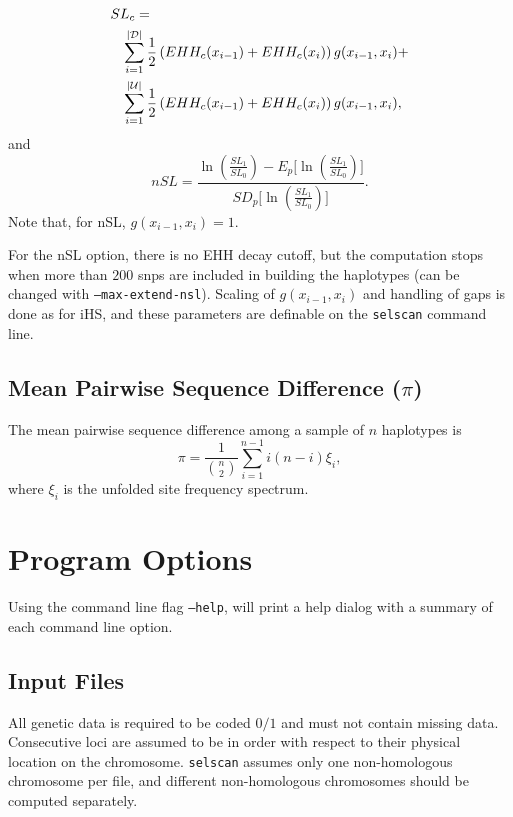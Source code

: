 \documentclass[12pt]{article}%
\newcommand{\negspace}{\!\!\!\!\!\!\!\!\!\!\!\!}
\begin{document}
\begin{align}\label{eq:sl}
SL_c =& \notag\\
&\negspace\sum_{i = 1}^{|\mathcal{D}|} \frac{1}{2}\left(EHH_c(x_{i-1}) + EHH_c(x_i)\right)g(x_{i-1},x_i) + \notag\\
&\negspace\sum_{i = 1}^{|\mathcal{U}|} \frac{1}{2}\left(EHH_c(x_{i-1}) + EHH_c(x_i)\right)g(x_{i-1},x_i),
\end{align}
and
\begin{equation}
nSL = \frac{\ln\left(\frac{SL_1}{SL_0}\right) - E_p\Big[\ln\left(\frac{SL_1}{SL_0}\right)\Big]}{SD_p\Big[\ln\left(\frac{SL_1}{SL_0}\right)\Big]}.
\end{equation}
Note that, for nSL, $g(x_{i-1},x_i) = 1$.

For the nSL option, there is no EHH decay cutoff, but the computation stops when more than $200$ snps are included in building the haplotypes (can be changed with {\tt --max-extend-nsl}).  Scaling of $g(x_{i-1},x_i)$ and handling of gaps is done as for iHS, and these parameters are definable 
on the {\tt selscan} command line.

\subsection{Mean Pairwise Sequence Difference ($\pi$)}\label{sec:pi}

The mean pairwise sequence difference among a sample of $n$ haplotypes is 
\begin{equation}
\pi = \frac{1}{{n \choose 2}} \sum_{i = 1}^{n-1} i(n-i)\xi_i,
\end{equation}
where $\xi_i$ is the unfolded site frequency spectrum.

\section{Program Options}

Using the command line flag {\tt --help}, will print a help dialog with a summary of each command line option.

\subsection{Input Files}

All genetic data is required to be coded $0/1$ and must not contain missing data.  Consecutive loci are assumed to be in order with respect to their physical location on the chromosome.  {\tt selscan} assumes only one non-homologous chromosome per file, and different non-homologous chromosomes should be computed separately.
\end{document}
